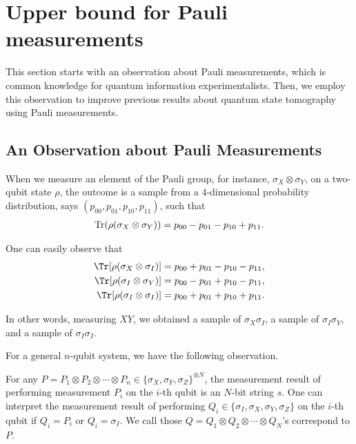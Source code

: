 \section{Upper bound for Pauli measurements}
\label{sec:pauli-upper}
This section starts with an observation about Pauli measurements, which is common knowledge for quantum information experimentalists. Then, we employ this observation to improve previous results about quantum state tomography using Pauli measurements.

\subsection{ An Observation about Pauli Measurements}
When we measure an element of the Pauli group, for instance, $\sigma_X\otimes \sigma_Y$, on a two-qubit state $\rho$, the outcome is a sample from a $4$-dimensional probability distribution, says $(p_{00},p_{01},p_{10},p_{11})$, such that
\begin{align*}
\operatorname{Tr}(\rho(\sigma_X\otimes \sigma_Y))=p_{00}-p_{01}-p_{10}+p_{11}.
\end{align*}

One can easily observe that
\begin{align*}
\Tr[\rho(\sigma_X\otimes \sigma_I)]=p_{00}+p_{01}-p_{10}-p_{11},\\
\Tr[\rho(\sigma_I\otimes \sigma_Y)]=p_{00}-p_{01}+p_{10}-p_{11},\\
\Tr[\rho(\sigma_I\otimes \sigma_I)]=p_{00}+p_{01}+p_{10}+p_{11}.
\end{align*}


In other words, measuring $XY$, we obtained a sample of $\sigma_X\sigma_I$, a sample of $\sigma_I\sigma_Y$, and a sample of $\sigma_I\sigma_I$. 

For a general $n$-qubit system, we have the following observation.
\begin{observation}
For any $P=P_1\otimes P_2\otimes\cdots\otimes P_n\in\{\sigma_X,\sigma_Y,\sigma_Z\}^{\otimes N}$, the measurement result of performing measurement $P_i$ on the $i$-th qubit is an $N$-bit string $s$. One can interpret the measurement result of performing $Q_i\in\{\sigma_I,\sigma_X,\sigma_Y,\sigma_Z\}$ on the $i$-th qubit if $Q_i=P_i$ or $Q_i=\sigma_I$. We call those $Q=Q_1\otimes Q_2\otimes\cdots\otimes Q_N$'s correspond to $P$.
\end{observation}



